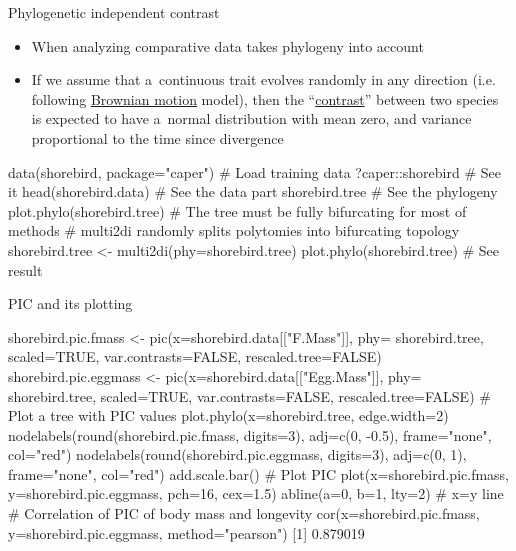 \documentclass[compress, xelatex, 11pt, xcolor=svgnames, aspectratio=169,
	hyperref={
		bookmarks=true,
		unicode=true,
		colorlinks=true,
		pdftitle={Molecular data in R},
		plainpages=false,
		pdfauthor={Vojtech Zeisek},
		pdfsubject={Course about phylogeny and evolution in R},
		pdfcreator={XeLaTeX},
		pdfkeywords={R, evolution, phylogeny, molecular data},
		linkcolor=Crimson, %
		anchorcolor=Magenta, %
		citecolor=Magenta, %
		filecolor=Magenta, %
		menucolor=Magenta, %
		urlcolor=DodgerBlue, %
		},
	url={hyphens, lowtilde} %
	]{beamer}
\begin{document}
\begin{frame}[fragile]{Phylogenetic independent contrast}
	\begin{itemize}
		\item When analyzing comparative data takes phylogeny into account
		\item If we assume that a~continuous trait evolves randomly in any direction (i.e. following \href{https://en.wikipedia.org/wiki/Brownian_motion}{Brownian motion} model), then the \enquote{\href{https://en.wikipedia.org/wiki/Contrast_(statistics)}{contrast}} between two species is expected to have a~normal distribution with mean zero, and variance proportional to the time since divergence
	\end{itemize}
	\begin{spluscode}
    data(shorebird, package="caper") # Load training data
    ?caper::shorebird # See it
    head(shorebird.data) # See the data part
    shorebird.tree # See the phylogeny
    plot.phylo(shorebird.tree)
    # The tree must be fully bifurcating for most of methods
    # multi2di randomly splits polytomies into bifurcating topology
    shorebird.tree <- multi2di(phy=shorebird.tree)
    plot.phylo(shorebird.tree) # See result
	\end{spluscode}
\end{frame}

\begin{frame}[fragile]{PIC and its plotting}
	\begin{spluscode}
    shorebird.pic.fmass <- pic(x=shorebird.data[["F.Mass"]], phy=
      shorebird.tree, scaled=TRUE, var.contrasts=FALSE, rescaled.tree=FALSE)
    shorebird.pic.eggmass <- pic(x=shorebird.data[["Egg.Mass"]], phy=
      shorebird.tree, scaled=TRUE, var.contrasts=FALSE, rescaled.tree=FALSE)
    # Plot a tree with PIC values
    plot.phylo(x=shorebird.tree, edge.width=2)
    nodelabels(round(shorebird.pic.fmass, digits=3), adj=c(0, -0.5),
      frame="none", col="red")
    nodelabels(round(shorebird.pic.eggmass, digits=3), adj=c(0, 1),
      frame="none", col="red")
    add.scale.bar()
    # Plot PIC
    plot(x=shorebird.pic.fmass, y=shorebird.pic.eggmass, pch=16, cex=1.5)
    abline(a=0, b=1, lty=2) # x=y line
    # Correlation of PIC of body mass and longevity
    cor(x=shorebird.pic.fmass, y=shorebird.pic.eggmass, method="pearson")
    [1] 0.879019
	\end{spluscode}
\end{frame}
\end{document}
